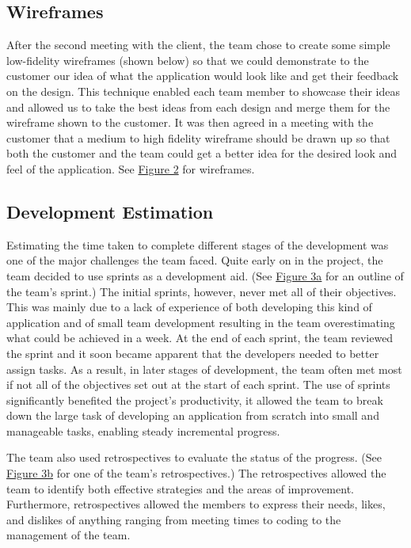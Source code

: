 \documentclass{l3proj}
\begin{document}
\subsection{Wireframes}
After the second meeting with the client, the team chose to create some simple low-fidelity wireframes (shown below) so that we could demonstrate to the customer our idea of what the application would look like and get their feedback on the design. This technique enabled each team member to showcase their ideas and allowed us to take the best ideas from each design and merge them for the wireframe shown to the customer. It was then agreed in a meeting with the customer that a medium to high fidelity wireframe should be drawn up so that both the customer and the team could get a better idea for the desired look and feel of the application. See \hyperref[fig:wireframes]{Figure 2} for wireframes.




\subsection{Development Estimation}
Estimating the time taken to complete different stages of the development was one of the major challenges the team faced. Quite early on in the project, the team decided to use sprints as a development aid. (See \hyperref[fig:estimation]{Figure 3a} for an outline of the team's sprint.) The initial sprints, however, never met all of their objectives. This was mainly due to a lack of experience of both developing this kind of application and of small team development resulting in the team overestimating what could be achieved in a week. At the end of each sprint, the team reviewed the sprint and it soon became apparent that the developers needed to better assign tasks. As a result, in later stages of development, the team often met most if not all of the objectives set out at the start of each sprint. The use of sprints significantly benefited the project's productivity, it allowed the team to break down the large task of developing an application from scratch into small and manageable tasks, enabling steady incremental progress.

The team also used retrospectives to evaluate the status of the progress. (See \hyperref[fig:estimation]{Figure 3b} for one of the team's retrospectives.) The retrospectives allowed the team to identify both effective strategies and the areas of improvement. Furthermore, retrospectives allowed the members to express their needs, likes, and dislikes of anything ranging from meeting times to coding to the management of the team.
\end{document}
